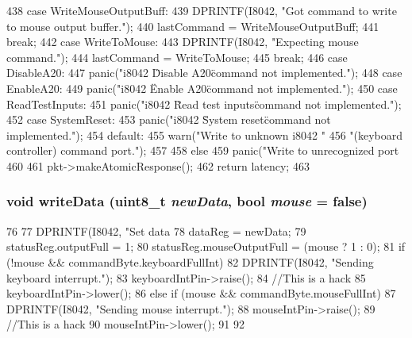\begin{DoxyCode}
{{{438           case WriteMouseOutputBuff:
439             DPRINTF(I8042, "Got command to write to mouse output buffer.\n");
440             lastCommand = WriteMouseOutputBuff;
441             break;
442           case WriteToMouse:
443             DPRINTF(I8042, "Expecting mouse command.\n");
444             lastCommand = WriteToMouse;
445             break;
446           case DisableA20:
447             panic("i8042 \"Disable A20\" command not implemented.\n");
448           case EnableA20:
449             panic("i8042 \"Enable A20\" command not implemented.\n");
450           case ReadTestInputs:
451             panic("i8042 \"Read test inputs\" command not implemented.\n");
452           case SystemReset:
453             panic("i8042 \"System reset\" command not implemented.\n");
454           default:
455             warn("Write to unknown i8042 "
456                     "(keyboard controller) command port.\n");
457         }
458     } else {
459         panic("Write to unrecognized port %
460     }
461     pkt->makeAtomicResponse();
462     return latency;
463 }
\end{DoxyCode}
\hypertarget{classX86ISA_1_1I8042_abc11493a3bf9f79d51f3c434c64483da}{
\subsubsection[{writeData}]{\setlength{\rightskip}{0pt plus 5cm}void writeData (uint8\_\-t {\em newData}, \/  bool {\em mouse} = {\ttfamily false})}}
\label{classX86ISA_1_1I8042_abc11493a3bf9f79d51f3c434c64483da}



\begin{DoxyCode}
76 {
77     DPRINTF(I8042, "Set data %
78     dataReg = newData;
79     statusReg.outputFull = 1;
80     statusReg.mouseOutputFull = (mouse ? 1 : 0);
81     if (!mouse && commandByte.keyboardFullInt) {
82         DPRINTF(I8042, "Sending keyboard interrupt.\n");
83         keyboardIntPin->raise();
84         //This is a hack
85         keyboardIntPin->lower();
86     } else if (mouse && commandByte.mouseFullInt) {
87         DPRINTF(I8042, "Sending mouse interrupt.\n");
88         mouseIntPin->raise();
89         //This is a hack
90         mouseIntPin->lower();
91     }
92 }
\end{DoxyCode}


